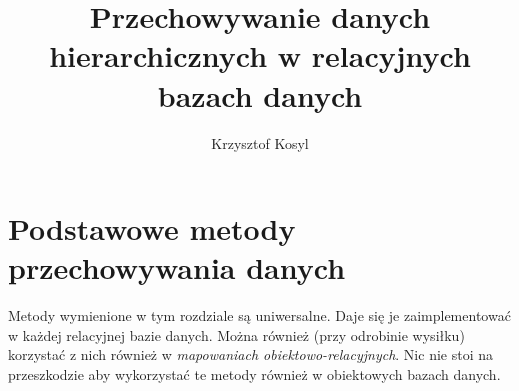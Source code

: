 \documentclass[12pt,a4paper,oneside]{report}
\author{Krzysztof Kosyl}
\title{Przechowywanie danych hierarchicznych w relacyjnych bazach danych}
\begin{document}



\tableofcontents{}






\chapter{Podstawowe metody przechowywania danych}

Metody wymienione w tym rozdziale są uniwersalne. Daje się je zaimplementować w każdej relacyjnej bazie danych. 
Można również (przy odrobinie wysiłku) korzystać z nich również w \emph{mapowaniach obiektowo-relacyjnych}.
Nic nie stoi na przeszkodzie aby wykorzystać te metody również w obiektowych bazach danych.

	
	
	\clearpage

	
	\clearpage

	
	\clearpage
	
	
	\clearpage
\end{document}
